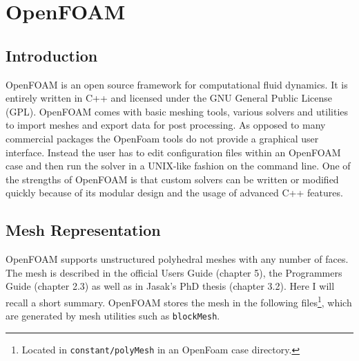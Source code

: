 \section{OpenFOAM}
\label{sec:OpenFOAM}

\subsection{Introduction}

OpenFOAM is an open source framework for computational fluid dynamics. It is entirely written in C++ and licensed under the GNU General Public License (GPL). OpenFOAM comes with basic meshing tools, various solvers and utilities to import meshes and export data for post processing. As opposed to many commercial packages the OpenFoam tools do not provide a graphical user interface. Instead the user has to edit configuration files within an OpenFOAM case and then run the solver in a UNIX-like fashion on the command line. One of the strengths of OpenFOAM is that custom solvers can be written or modified quickly because of its modular design and the usage of advanced C++ features.

\subsection{Mesh Representation}
\label{sec:meshRepresentation}

OpenFOAM supports unstructured polyhedral meshes with any number of faces. The mesh is described in the official Users Guide \cite{ug08} (chapter 5), the Programmers Guide \cite{pg08} (chapter 2.3) as well as in Jasak's PhD thesis \cite{jasak96} (chapter 3.2). Here I will recall a short summary. OpenFOAM stores the mesh in the following files\footnote{Located in \verb+constant/polyMesh+ in an OpenFoam case directory.}, which are generated by mesh utilities such as \verb+blockMesh+.


